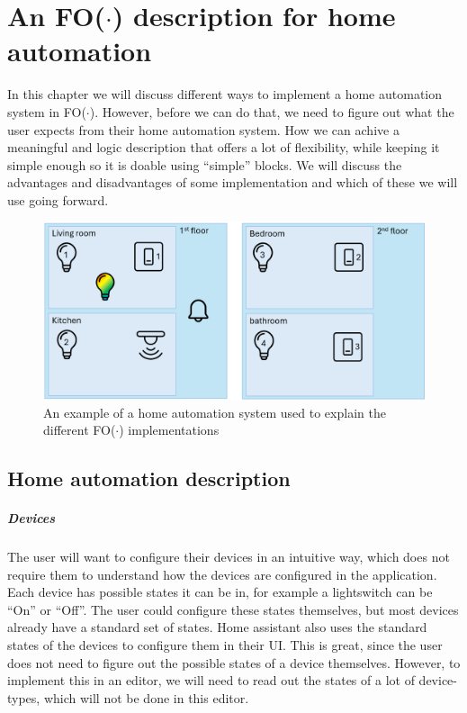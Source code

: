 \documentclass[11pt,a4paper]{report}
\newcommand{\fodot}{FO($\cdot$)\xspace}
\begin{document}
\chapter{An \fodot description for home automation}
In this chapter we will discuss different ways to implement a home automation system in \fodot. However, before we can do that, we need to figure out what the user expects from their home automation system. How we can achive a meaningful and logic description that offers a lot of flexibility, while keeping it simple enough so it is doable using ``simple'' blocks. We will discuss the advantages and disadvantages of some implementation and which of these we will use going forward.
\begin{figure}
    \centering
    \includegraphics[width=0.8\linewidth]{images/fodot-structure_example.png}
    \caption{An example of a home automation system used to explain the different \fodot implementations}
    \label{fig:fodot-structure_example}
\end{figure}

\section{Home automation description}
\paragraph{Devices}
The user will want to configure their devices in an intuitive way, which does not require them to understand how the devices are configured in the application. Each device has possible states it can be in, for example a lightswitch can be ``On'' or ``Off''. The user could configure these states themselves, but most devices already have a standard set of states. Home assistant also uses the standard states of the devices to configure them in their UI. This is great, since the user does not need to figure out the possible states of a device themselves. However, to implement this in an editor, we will need to read out the states of a lot of device-types, which will not be done in this editor.
\end{document}
